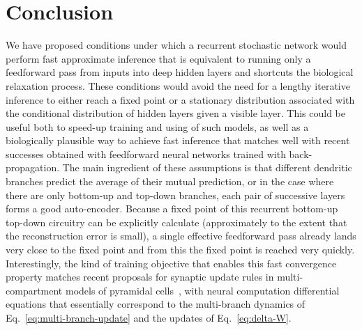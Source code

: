 \documentclass{article}
\begin{document}
\iffalse
\subsection{Biological Implementation}

\section{Related Work}

\cite{Scellier+Bengio-arxiv2016}

\citep{Xie+Seung-2003}

\section{Experimental Validation}
\fi

\section{Conclusion}

We have proposed conditions under which a recurrent stochastic network would perform fast approximate inference
that is equivalent to running only a feedforward pass from inputs into deep hidden layers and shortcuts
the biological relaxation process. These conditions
would avoid the need for a lengthy iterative inference to either reach a fixed point or a stationary distribution
associated with the conditional distribution of hidden layers given a visible layer. This could be useful
both to speed-up training and using of such models, as well as a biologically plausible way to achieve
fast inference that matches well with recent successes obtained with feedforward neural networks trained
with back-propagation. The main ingredient of these assumptions is that different dendritic branches
predict the average of their mutual prediction, or in the case where there are only bottom-up
and top-down branches, each pair of successive layers
forms a good auto-encoder. Because a fixed point of this recurrent bottom-up top-down circuitry
can be explicitly calculate (approximately to the extent that the reconstruction error is small),
a single effective feedforward pass already lands very close to the fixed point and from this
the fixed point is reached very quickly.
Interestingly, the kind of training objective that enables this fast convergence property
matches recent proposals for synaptic update rules
in multi-compartment models of pyramidal cells~\citep{Urbanczik+Senn-2014}, with neural computation
differential equations that essentially correspond to the multi-branch dynamics
of Eq.~\ref{eq:multi-branch-update} and the updates of Eq.~\ref{eq:delta-W}.
\end{document}
